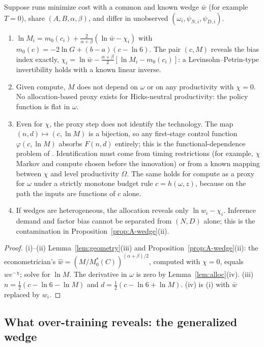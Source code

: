 \begin{proposition}\label{prop:proxy}
Suppose runs minimize cost with a common and known wedge $\bar w$ (for example $T=0$), share $(A,B,\alpha,\beta)$, and
differ in unobserved $(\omega_i,\psi_{N,i},\psi_{D,i})$.
\begin{enumerate}
\item[(i)] $\ln M_i=m_0(c_i)+\frac{2}{\alpha+\beta}(\ln\bar w-\chi_i)$ with $m_0(c)=-2\ln G+(b-a)(c-\ln6)$. The pair $(c,M)$
reveals the bias index exactly, $\chi_i=\ln\bar w-\tfrac{\alpha+\beta}{2}[\ln M_i-m_0(c_i)]$: a
Levinsohn--Petrin-type invertibility holds with a known linear inverse.
\item[(ii)] Given compute, $M$ does not depend on $\omega$ or on any productivity with $\chi=0$. No allocation-based
proxy exists for Hicks-neutral productivity: the policy function is flat in $\omega$.
\item[(iii)] Even for $\chi$, the proxy step does not identify the technology. The map $(n,d)\mapsto(c,\ln M)$ is a
bijection, so any first-stage control function $\varphi(c,\ln M)$ absorbs $F(n,d)$ entirely; this is the
functional-dependence problem of \citet{ackerberg2015identification}. Identification must come from timing
restrictions (for example, $\chi$ Markov and compute chosen before the innovation) or from a known mapping between $\chi$
and level productivity $\Omega$. The same holds for compute as a proxy for $\omega$ under a strictly monotone budget rule
$c=h(\omega,z)$, because on the path the inputs are functions of $c$ alone.
\item[(iv)] If wedges are heterogeneous, the allocation reveals only $\ln w_i-\chi_i$. Inference demand and factor bias
cannot be separated from $(N,D)$ alone; this is the contamination in Proposition~\ref{prop:A-wedge}(ii).
\end{enumerate}
\end{proposition}

\begin{proof}
(i)--(ii) Lemma~\ref{lem:geometry}(iii) and Proposition~\ref{prop:A-wedge}(ii): the econometrician's
$\hat w=(M/M^*_0(C))^{(\alpha+\beta)/2}$, computed with $\chi=0$, equals $we^{-\chi}$; solve for $\ln M$. The derivative in
$\omega$ is zero by Lemma~\ref{lem:alloc}(iv). (iii) $n=\tfrac12(c-\ln6-\ln M)$ and $d=\tfrac12(c-\ln6+\ln M)$. (iv) is (i)
with $\bar w$ replaced by $w_i$.
\end{proof}

\subsection{What over-training reveals: the generalized wedge}\label{app:wedge}

